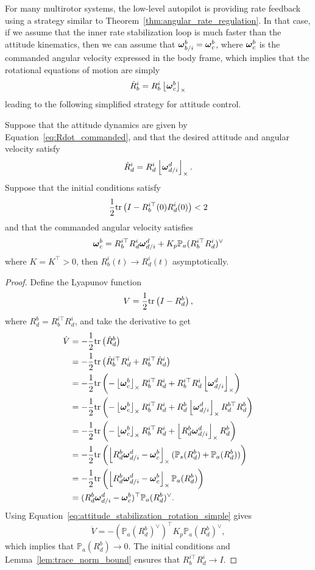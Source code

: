 For many multirotor systems, the low-level autopilot is providing rate feedback using a strategy similar to Theorem~\ref{thm:angular_rate_regulation}.  In that case, if we assume that the inner rate stabilization loop is much faster than the attitude kinematics, then we can assume that $\boldsymbol{\omega}_{b/i}^b = \boldsymbol{\omega}_c^b$, where $\boldsymbol{\omega}_c^b$ is the commanded angular velocity expressed in the body frame, which implies that the rotational equations of motion are simply
\begin{equation}\label{eq:Rdot_commanded}
\dot{R}_b^i = R_b^i \ss{\omegabf_c^b}
\end{equation}
leading to the following simplified strategy for attitude control.
\begin{theorem}\label{thm:attitude_stabilization_rotation_simple}
	Suppose that the attitude dynamics are given by Equation~\eqref{eq:Rdot_commanded}, and that the desired attitude and angular velocity satisfy
	\[
	\dot{R}_d^i = R_d^i \left\lfloor\boldsymbol{\omega}_{d/i}^d\right\rfloor_{\times}.
	\]
	Suppose that the initial conditions satisfy
	\[
	\frac{1}{2}\text{tr}\left(I-R_b^{i\top}(0)R_d^i(0)\right) < 2
	\]
	and that the commanded angular velocity satisfies
	\begin{equation}\label{eq:attitude_stabilization_rotation_simple}
		\omegabf_c^b = R_b^{i\top}R_d^i \omegabf_{d/i}^d + K_p \mathbb{P}_a(R_b^{i\top}R_d^i)^\vee
	\end{equation}
	where $K=K^\top >0$, then $R_b^i(t) \to R_d^i(t)$ asymptotically.
\end{theorem}
\begin{proof}
Define the Lyapunov function
\[
V = \frac{1}{2}\text{tr}\left(I-R_d^b\right),
\]
where $R_d^b=R_b^{i\top}R_d^i$,
and take the derivative to get
\begin{align*}
\dot{V} &= -\frac{1}{2}\text{tr}\left(\dot{R}_d^b\right) \\
	&= 	-\frac{1}{2}\text{tr}\left(\dot{R}_b^{i\top}R_d^i + R_b^{i\top}\dot{R}_d^i\right) \\
	&=  -\frac{1}{2}\text{tr}\left(-\left\lfloor\boldsymbol{\omega}_c^b\right\rfloor_{\times}R_b^{i\top}R_d^i + R_b^{i\top}R_d^i\left\lfloor\boldsymbol{\omega}_{d/i}^d\right\rfloor_{\times}\right) \\
	&=  -\frac{1}{2}\text{tr}\left(-\left\lfloor\boldsymbol{\omega}_c^b\right\rfloor_{\times}R_b^{i\top}R_d^i + R_d^b\left\lfloor\boldsymbol{\omega}_{d/i}^d\right\rfloor_{\times}R_d^{b\top}R_d^b\right) \\
	&=  -\frac{1}{2}\text{tr}\left(-\left\lfloor\boldsymbol{\omega}_c^b\right\rfloor_{\times}R_b^{i\top}R_d^i + \left\lfloor R_d^b\boldsymbol{\omega}_{d/i}^d\right\rfloor_{\times}R_d^b\right) \\
	&=  -\frac{1}{2}\text{tr}\left(\left\lfloor R_d^b\boldsymbol{\omega}_{d/i}^d-\boldsymbol{\omega}_c^b\right\rfloor_{\times}(\mathbb{P}_s(R_d^b)+\mathbb{P}_a(R_d^b))\right) \\
	&=  -\frac{1}{2}\text{tr}\left(\left\lfloor R_d^b\boldsymbol{\omega}_{d/i}^d-\boldsymbol{\omega}_c^b\right\rfloor_{\times}\mathbb{P}_a(R_d^b)\right) \\
	&=  (R_d^b\boldsymbol{\omega}_{d/i}^d-\boldsymbol{\omega}_c^b)^\top \mathbb{P}_a(R_d^b)^\vee.
\end{align*}
Using Equation~\eqref{eq:attitude_stabilization_rotation_simple} gives
\[
\dot{V} = -(\mathbb{P}_a(R_d^b)^\vee)^\top K_p \mathbb{P}_a(R_d^b)^\vee,
\]
which implies that $\mathbb{P}_a(R_d^b) \to 0$.  The initial conditions and Lemma~\ref{lem:trace_norm_bound} ensures that 
$R_b^{i\top}R_d^i \to I$.
\end{proof}

